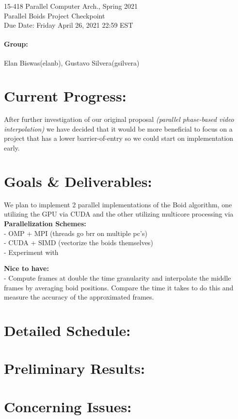 \documentclass[12pt]{article}
\begin{document}
\begin{centering}
    {\large 15-418 Parallel Computer Arch., Spring 2021\\}
    \vspace{2ex}
    {\LARGE Parallel Boids Project Checkpoint\\}
    \vspace{2ex}
    {\large Due Date: Friday April 26, 2021 22:59 EST\\}
\end{centering}

\bigskip

\paragraph{Group:} Elan Biswas(elanb), Gustavo Silvera(gsilvera)

\section*{Current Progress:} 
\par After further investigation of our original proposal \textit{(parallel phase-based video interpolation)} we have decided that it would be more beneficial to focus on a project that has a lower barrier-of-entry so we could start on implementation early. 

\section*{Goals & Deliverables:} 
We plan to implement 2 parallel implementations of the Boid algorithm, one utilizing the GPU via CUDA and the other utilizing multicore processing via 
\textbf{Parallelization Schemes:}\\
- OMP + MPI (threads go brr on multiple pc's)\\
- CUDA + SIMD (vectorize the boids themselves)\\
- Experiment with 

\textbf{Nice to have:}\\
- Compute frames at double the time granularity and interpolate the middle frames 
  by averaging boid positions. Compare the time it takes to do this and measure the 
  accuracy of the approximated frames. 


\section*{Detailed Schedule:} 
\section*{Preliminary Results:} 
\section*{Concerning Issues:} 
\end{document}
